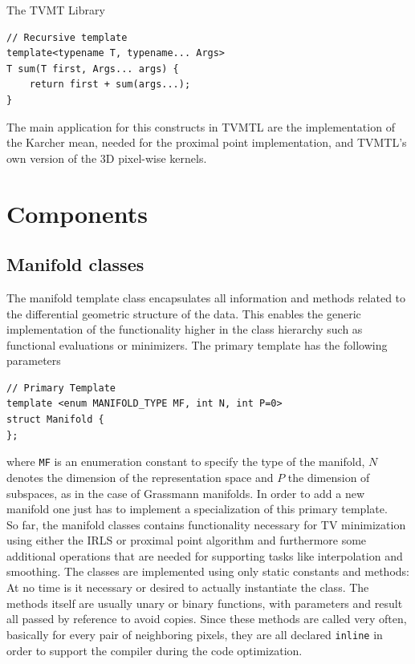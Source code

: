 \begin{chapter}{The TVMT Library}
\begin{lstlisting}[label=code:variadic,caption={Variadic template example}]
// Recursive template
template<typename T, typename... Args>
T sum(T first, Args... args) {
    return first + sum(args...);
}
\end{lstlisting}

The main application for this constructs in TVMTL are the implementation of the Karcher mean, needed for the proximal point implementation, and TVMTL's own version
of the 3D pixel-wise kernels.


\section{Components} %
\label{sec:Components}

\subsection{Manifold classes} %
\label{sub:Manifold classes}
The manifold template class encapsulates all information and methods related to the differential geometric structure of the data. 
This enables the generic implementation of the functionality higher in the class hierarchy such as functional evaluations or minimizers.
The primary template has the following parameters
\cppinline
\begin{lstlisting}
// Primary Template
template <enum MANIFOLD_TYPE MF, int N, int P=0>
struct Manifold {
}; 
\end{lstlisting}
where \texttt{MF} is an enumeration constant to specify the type of the manifold, $N$ denotes the dimension of the representation space and $P$ the dimension of subspaces,
as in the case of Grassmann manifolds. In order to add a new manifold one just has to implement a specialization of this primary template.\\

So far, the manifold classes contains functionality necessary for TV minimization using either the IRLS or proximal point algorithm and furthermore some additional operations
that are needed for supporting tasks like interpolation and smoothing. The classes are implemented using only static constants and methods: At no time is it necessary or 
desired to actually instantiate the class. The methods itself are usually unary or binary functions, with parameters and result all passed by reference to avoid copies.
Since these methods are called very often, basically for every pair of neighboring pixels, they are all declared \texttt{inline} in order to support the compiler during 
the code optimization.\\


\end{chapter}
